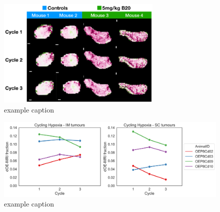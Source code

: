 \begin{figure}[htbp]
   \centering
   \includegraphics[width=0.7\textwidth]{images/99_3_cychypox.png} %
   \caption{example caption}
   \label{fig:example}
\end{figure}
\begin{figure}[htbp]
   \centering
   \includegraphics[width=\textwidth]{images/99_4_OEP8_CyclingHypoxia.png} %
   \caption{example caption}
   \label{fig:example}
\end{figure}
